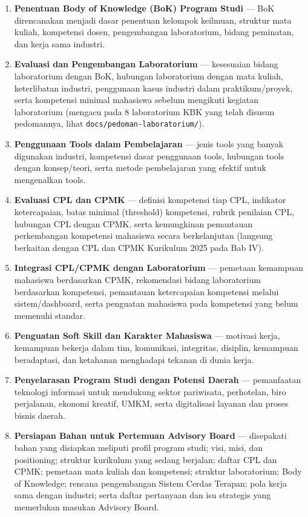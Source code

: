 \begin{enumerate}
\item \textbf{Penentuan Body of Knowledge (BoK) Program Studi} --- BoK direncanakan menjadi dasar penentuan kelompok keilmuan, struktur mata kuliah, kompetensi dosen, pengembangan laboratorium, bidang peminatan, dan kerja sama industri.
\item \textbf{Evaluasi dan Pengembangan Laboratorium} --- kesesuaian bidang laboratorium dengan BoK, hubungan laboratorium dengan mata kuliah, keterlibatan industri, penggunaan kasus industri dalam praktikum/proyek, serta kompetensi minimal mahasiswa sebelum mengikuti kegiatan laboratorium (mengacu pada 8 laboratorium KBK yang telah disusun pedomannya, lihat \texttt{docs/pedoman-laboratorium/}).
\item \textbf{Penggunaan Tools dalam Pembelajaran} --- jenis tools yang banyak digunakan industri, kompetensi dasar penggunaan tools, hubungan tools dengan konsep/teori, serta metode pembelajaran yang efektif untuk mengenalkan tools.
\item \textbf{Evaluasi CPL dan CPMK} --- definisi kompetensi tiap CPL, indikator ketercapaian, batas minimal (threshold) kompetensi, rubrik penilaian CPL, hubungan CPL dengan CPMK, serta kemungkinan pemantauan perkembangan kompetensi mahasiswa secara berkelanjutan (langsung berkaitan dengan CPL dan CPMK Kurikulum 2025 pada Bab IV).
\item \textbf{Integrasi CPL/CPMK dengan Laboratorium} --- pemetaan kemampuan mahasiswa berdasarkan CPMK, rekomendasi bidang laboratorium berdasarkan kompetensi, pemantauan ketercapaian kompetensi melalui sistem/dashboard, serta penguatan mahasiswa pada kompetensi yang belum memenuhi standar.
\item \textbf{Penguatan Soft Skill dan Karakter Mahasiswa} --- motivasi kerja, kemampuan bekerja dalam tim, komunikasi, integritas, disiplin, kemampuan beradaptasi, dan ketahanan menghadapi tekanan di dunia kerja.
\item \textbf{Penyelarasan Program Studi dengan Potensi Daerah} --- pemanfaatan teknologi informasi untuk mendukung sektor pariwisata, perhotelan, biro perjalanan, ekonomi kreatif, UMKM, serta digitalisasi layanan dan proses bisnis daerah.
\item \textbf{Persiapan Bahan untuk Pertemuan Advisory Board} --- disepakati bahan yang disiapkan meliputi profil program studi; visi, misi, dan positioning; struktur kurikulum yang sedang berjalan; daftar CPL dan CPMK; pemetaan mata kuliah dan kompetensi; struktur laboratorium; Body of Knowledge; rencana pengembangan Sistem Cerdas Terapan; pola kerja sama dengan industri; serta daftar pertanyaan dan isu strategis yang memerlukan masukan Advisory Board.
\end{enumerate}

